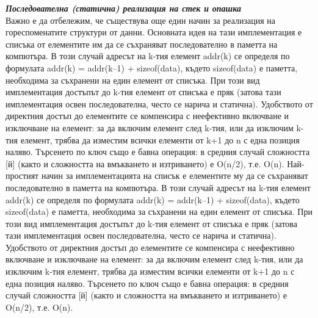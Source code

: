 \documentclass[11pt]{article} %
\begin{document}
\textit{\textbf{Последователна (статична) реализация на стек и опашка}}\\
Важно е да отбележим, че съществува още един начин за реализация на гореспоменатите структури от данни. Основната идея на тази имплементация е списъка от елементите им да се съхраняват последователно в паметта на компютъра. В този случай адресът на k-тия елемент addr(k) се определя по формулата addr(k) = addr(k–1) + sizeof(data), където sizeof(data) е паметта, необходима за съхранени на един елемент от списъка. При този вид имплементация достъпът до k-тия елемент от списъка е пряк (затова тази имплементация освен последователна, често се нарича и статична).
Удобството от директния достъп до елементите се компенсира с неефективно включване и изключване на елемент: за да включим елемент след k-тия, или да изключим k-тия елемент, трябва да изместим всички елементи от k+1 до n с една позиция наляво. Търсенето по ключ също е бавна операция: в средния случай сложността [й] (както и сложността на вмъкването и изтриването) е O(n/2), т.е. O(n).
Най-простият начин за имплементацията на списък е елементите му да се съхраняват последователно в паметта на компютъра. В този случай адресът на k-тия елемент addr(k) се определя по формулата addr(k) = addr(k–1) + sizeof(data), където sizeof(data) е паметта, необходима за съхранени на един елемент от списъка. При този вид имплементация достъпът до k-тия елемент от списъка е пряк (затова тази имплементация освен последователна, често се нарича и статична).
Удобството от директния достъп до елементите се компенсира с неефективно включване и изключване на елемент: за да включим елемент след k-тия, или да изключим k-тия елемент, трябва да изместим всички елементи от k+1 до n с една позиция наляво. Търсенето по ключ също е бавна операция: в средния случай сложността [й] (както и сложността на вмъкването и изтриването) е O(n/2), т.е. O(n).
\end{document}
